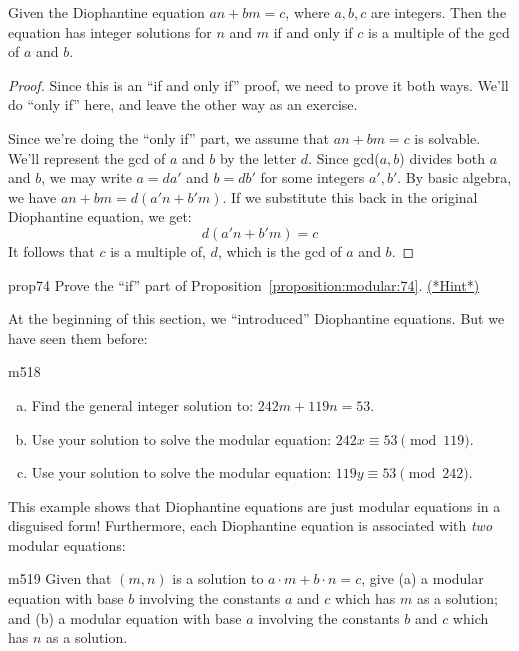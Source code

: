 \begin{prop}{74}
Given the Diophantine equation $an + bm = c$, where $a,b,c$ are integers. Then the equation  has integer solutions for $n$ and $m$  if and only if $c$ is a multiple of the gcd of $a$ and $b$.
\end{prop}
\begin{proof}{}
Since this is an ``if and only if'' proof, we need to prove it both ways.  We'll do ``only if''  here, and leave the other way as an exercise.

Since we're doing the ``only if'' part, we assume that $an + bm = c$ is solvable.
We'll represent the gcd of $a$ and $b$ by the letter $d$. Since gcd($a,b$) divides both $a$ and $b$, we may write $a = da'$ and $b = db'$ for some integers $a',b'$.  By basic algebra, we have $an+bm =d(a'n +b'm)$. If we substitute this back in the original Diophantine equation, we get:
\[d(a'n +b'm)=c\]
It follows that $c$ is a multiple of, $d$, which is the gcd of $a$ and $b$.
\end{proof}

\begin{exercise}{prop74}
Prove the ``if'' part of Proposition~\ref{proposition:modular:74}. 
\hyperref[sec:modular_arithmetic:hints]{(*Hint*)}
\end{exercise}


At the beginning of this section, we ``introduced'' Diophantine equations.  But we have seen them before:

\begin{exercise}{m518}
\begin{enumerate}[(a)]
\item
Find the general integer solution to: $242m + 119n = 53$.
\item 
Use your solution to solve the modular equation: $242x \equiv 53 \pmod{119}$.
\item
Use your solution to solve the modular equation:  $119y \equiv 53 \pmod{242}$.
\end{enumerate}
\end{exercise}
This example shows that Diophantine equations are just modular equations in a disguised form!  Furthermore, each Diophantine equation is associated with \emph{two} modular equations:

\begin{exercise}{m519}
Given that $(m,n)$ is a solution to $a \cdot m + b \cdot n  = c$, give (a) a modular equation with base $b$  involving the constants $a$ and $c$ which has $m$ as a solution; and (b) a modular equation with base $a$ involving the constants $b$ and $c$ which has $n$ as a solution.
\end{exercise}


